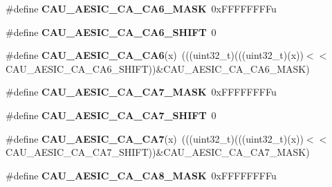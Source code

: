\begin{DoxyCompactItemize}
\item 
\#define {\bfseries C\+A\+U\+\_\+\+A\+E\+S\+I\+C\+\_\+\+C\+A\+\_\+\+C\+A6\+\_\+\+M\+A\+SK}~0x\+F\+F\+F\+F\+F\+F\+F\+Fu\hypertarget{group__CAU__Register__Masks_ga54d6732429da2f76aaca8e48c1f24a65}{}\label{group__CAU__Register__Masks_ga54d6732429da2f76aaca8e48c1f24a65}

\item 
\#define {\bfseries C\+A\+U\+\_\+\+A\+E\+S\+I\+C\+\_\+\+C\+A\+\_\+\+C\+A6\+\_\+\+S\+H\+I\+FT}~0\hypertarget{group__CAU__Register__Masks_ga69a702861a7ada57557747440c673f2f}{}\label{group__CAU__Register__Masks_ga69a702861a7ada57557747440c673f2f}

\item 
\#define {\bfseries C\+A\+U\+\_\+\+A\+E\+S\+I\+C\+\_\+\+C\+A\+\_\+\+C\+A6}(x)~(((uint32\+\_\+t)(((uint32\+\_\+t)(x))$<$$<$C\+A\+U\+\_\+\+A\+E\+S\+I\+C\+\_\+\+C\+A\+\_\+\+C\+A6\+\_\+\+S\+H\+I\+FT))\&C\+A\+U\+\_\+\+A\+E\+S\+I\+C\+\_\+\+C\+A\+\_\+\+C\+A6\+\_\+\+M\+A\+SK)\hypertarget{group__CAU__Register__Masks_gaccaa1243e2b214333eb520a63219c299}{}\label{group__CAU__Register__Masks_gaccaa1243e2b214333eb520a63219c299}

\item 
\#define {\bfseries C\+A\+U\+\_\+\+A\+E\+S\+I\+C\+\_\+\+C\+A\+\_\+\+C\+A7\+\_\+\+M\+A\+SK}~0x\+F\+F\+F\+F\+F\+F\+F\+Fu\hypertarget{group__CAU__Register__Masks_ga7e45df90e65bd21902c9c393b10d9320}{}\label{group__CAU__Register__Masks_ga7e45df90e65bd21902c9c393b10d9320}

\item 
\#define {\bfseries C\+A\+U\+\_\+\+A\+E\+S\+I\+C\+\_\+\+C\+A\+\_\+\+C\+A7\+\_\+\+S\+H\+I\+FT}~0\hypertarget{group__CAU__Register__Masks_gade98ca14bc2fb9d1b02a074073edcf82}{}\label{group__CAU__Register__Masks_gade98ca14bc2fb9d1b02a074073edcf82}

\item 
\#define {\bfseries C\+A\+U\+\_\+\+A\+E\+S\+I\+C\+\_\+\+C\+A\+\_\+\+C\+A7}(x)~(((uint32\+\_\+t)(((uint32\+\_\+t)(x))$<$$<$C\+A\+U\+\_\+\+A\+E\+S\+I\+C\+\_\+\+C\+A\+\_\+\+C\+A7\+\_\+\+S\+H\+I\+FT))\&C\+A\+U\+\_\+\+A\+E\+S\+I\+C\+\_\+\+C\+A\+\_\+\+C\+A7\+\_\+\+M\+A\+SK)\hypertarget{group__CAU__Register__Masks_ga61776b9b88c7dc4639cc9e2a14ab0aaf}{}\label{group__CAU__Register__Masks_ga61776b9b88c7dc4639cc9e2a14ab0aaf}

\item 
\#define {\bfseries C\+A\+U\+\_\+\+A\+E\+S\+I\+C\+\_\+\+C\+A\+\_\+\+C\+A8\+\_\+\+M\+A\+SK}~0x\+F\+F\+F\+F\+F\+F\+F\+Fu\hypertarget{group__CAU__Register__Masks_ga00cb0732940136f8434d5c19c522ebad}{}\label{group__CAU__Register__Masks_ga00cb0732940136f8434d5c19c522ebad}


\end{DoxyCompactItemize}
